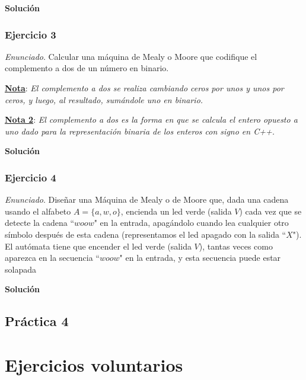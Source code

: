 \documentclass[11pt,a4paper]{article}
\newcommand{\enu}{\textit{Enunciado}}
\newcommand{\sol}{\textbf{Solución}}
\begin{document}
		\sol \par
		
		\subsubsection{Ejercicio 3}
		\enu. Calcular una máquina de Mealy o Moore que codifique el complemento a dos de un número en binario. \par
		\textbf{\underline{Nota}}: \textit{El complemento a dos se realiza cambiando ceros por unos y unos por ceros, y
		luego, al resultado, sumándole uno en binario.} \par
		\textbf{\underline{Nota 2}}: \textit{El complemento a dos es la forma en que se calcula el entero opuesto a uno
		dado para la representación binaria de los enteros con signo en C++.} \par
		
		\sol \par
		
		\subsubsection{Ejercicio 4}
		\enu. Diseñar una Máquina de Mealy o de Moore que, dada una cadena usando el alfabeto $A = \lbrace a, w, o
		\rbrace$, encienda un led verde (salida $V$) cada vez que se detecte la cadena ``$woow$" en la entrada,
		apagándolo cuando lea cualquier otro símbolo después de esta cadena (representamos el led apagado con la
		salida ``$X$"). El autómata tiene que encender el led verde (salida $V$), tantas veces como aparezca en la
		secuencia ``$woow$" en la entrada, y esta secuencia puede estar solapada \par
	
		\sol \par
		
		
	\newpage
	\subsection{Práctica 4}
	
	\newpage
	\section{Ejercicios voluntarios}
\end{document}
